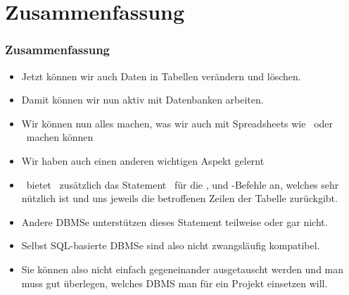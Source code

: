 \documentclass[aspectratio=169,mathserif,notheorems]{beamer}%
\begin{document}
\section{Zusammenfassung}%
%
\begin{frame}%
\frametitle{Zusammenfassung}%
\begin{itemize}%
\item Jetzt können wir auch Daten in Tabellen verändern und löschen.%
\item<2-> Damit können wir nun aktiv mit Datenbanken arbeiten.%
\item<3-> Wir können nun alles machen, was wir auch mit Spreadsheets wie \microsoftExcel\ oder \libreofficeCalc\ machen können%
\item<5-> Wir haben auch einen anderen wichtigen Aspekt gelernt%
\item<7-> \postgresql\ bietet \DEzB\ zusätzlich das Statement~ für die ,  und -Befehle an, welches sehr nützlich ist und uns jeweils die betroffenen Zeilen der Tabelle zurückgibt.%
\item<8-> Andere DBMSe unterstützen dieses Statement teilweise\cite{HWACIS:R,M:MSD:D,M:MSD:IR} oder gar nicht.%
\item<9-> Selbst SQL-basierte DBMSe sind also nicht zwangsläufig kompatibel.%
\item<10-> Sie können also nicht einfach gegeneinander ausgetauscht werden und man muss gut überlegen, welches DBMS man für ein Projekt einsetzen will.%
\end{itemize}%
\end{frame}%
%
\endPresentation%
\end{document}
